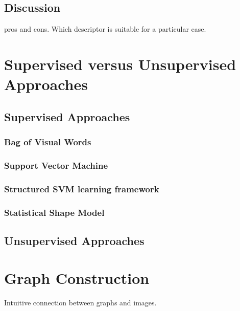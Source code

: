 \documentclass{SMBV12}
\begin{document}
\subsection{Discussion}

pros and cons. Which descriptor is suitable for a particular case.

\section{Supervised versus Unsupervised Approaches}



\subsection{Supervised Approaches}



\subsubsection{Bag of Visual Words}



\subsubsection{Support Vector Machine}

\subsubsection{Structured SVM learning framework}

\subsubsection{Statistical Shape Model}



\subsection{Unsupervised Approaches}



\section{Graph Construction}

Intuitive connection between graphs and images.
\end{document}
